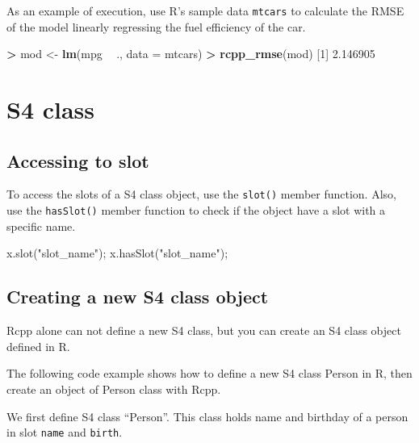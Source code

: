 \documentclass[]{book}
\newenvironment{Shaded}{\begin{snugshade}}{\end{snugshade}}
\newcommand{\DataTypeTok}[1]{\textcolor[rgb]{0.13,0.29,0.53}{#1}}
\newcommand{\DecValTok}[1]{\textcolor[rgb]{0.00,0.00,0.81}{#1}}
\newcommand{\FloatTok}[1]{\textcolor[rgb]{0.00,0.00,0.81}{#1}}
\newcommand{\KeywordTok}[1]{\textcolor[rgb]{0.13,0.29,0.53}{\textbf{#1}}}
\newcommand{\NormalTok}[1]{#1}
\newcommand{\OperatorTok}[1]{\textcolor[rgb]{0.81,0.36,0.00}{\textbf{#1}}}
\newcommand{\StringTok}[1]{\textcolor[rgb]{0.31,0.60,0.02}{#1}}
\begin{document}
As an example of execution, use R's sample data \texttt{mtcars} to calculate the RMSE of the model linearly regressing the fuel efficiency of the car.

\begin{Shaded}
\begin{Highlighting}[]
\OperatorTok{>}\StringTok{ }\NormalTok{mod <-}\StringTok{ }\KeywordTok{lm}\NormalTok{(mpg }\OperatorTok{~}\StringTok{ }\NormalTok{., }\DataTypeTok{data =}\NormalTok{ mtcars)}
\OperatorTok{>}\StringTok{ }\KeywordTok{rcpp_rmse}\NormalTok{(mod)}
\NormalTok{[}\DecValTok{1}\NormalTok{] }\FloatTok{2.146905}
\end{Highlighting}
\end{Shaded}

\hypertarget{s4-class}{%
\section{S4 class}\label{s4-class}}

\hypertarget{accessing-to-slot}{%
\subsection{Accessing to slot}\label{accessing-to-slot}}

To access the slots of a S4 class object, use the \texttt{slot()} member function. Also, use the \texttt{hasSlot()} member function to check if the object have a slot with a specific name.

\begin{Shaded}
\begin{Highlighting}[]
\NormalTok{x.slot(}\StringTok{"slot_name"}\NormalTok{);}
\NormalTok{x.hasSlot(}\StringTok{"slot_name"}\NormalTok{);}
\end{Highlighting}
\end{Shaded}

\hypertarget{creating-a-new-s4-class-object}{%
\subsection{Creating a new S4 class object}\label{creating-a-new-s4-class-object}}

Rcpp alone can not define a new S4 class, but you can create an S4 class object defined in R.

The following code example shows how to define a new S4 class Person in R, then create an object of Person class with Rcpp.

We first define S4 class ``Person''. This class holds name and birthday of a person in slot \texttt{name} and \texttt{birth}.
\end{document}
